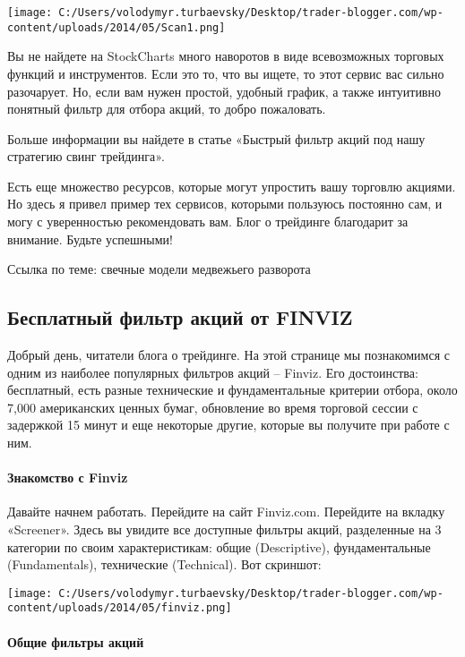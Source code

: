 \documentclass[a5paper]{article}
\begin{document}
\texttt{[image: C:/Users/volodymyr.turbaevsky/Desktop/trader-blogger.com/wp-content/uploads/2014/05/Scan1.png]}

Вы не найдете на StockCharts много наворотов в виде всевозможных торговых функций и инструментов. Если это то, что вы ищете, то этот сервис вас сильно разочарует. Но, если вам нужен простой, удобный график, а также интуитивно понятный фильтр для отбора акций, то добро пожаловать.

Больше информации вы найдете в статье «Быстрый фильтр акций под нашу стратегию свинг трейдинга».

Есть еще множество ресурсов, которые могут упростить вашу торговлю акциями. Но здесь я привел пример тех сервисов, которыми пользуюсь постоянно сам, и могу с уверенностью рекомендовать вам. Блог о трейдинге благодарит за внимание. Будьте успешными!


Ссылка по теме: свечные модели медвежьего разворота

\subsection{Бесплатный фильтр акций от FINVIZ}

Добрый день, читатели блога о трейдинге. На этой странице мы
познакомимся с одним из наиболее популярных фильтров акций –
Finviz. Его достоинства: бесплатный, есть разные технические и
фундаментальные критерии отбора, около 7,000 американских ценных
бумаг, обновление во время торговой сессии с задержкой 15 минут и еще
некоторые другие, которые вы получите при работе с ним.

\paragraph{Знакомство с Finviz}

Давайте начнем работать. Перейдите на сайт Finviz.com. Перейдите на
вкладку «Screener». Здесь вы увидите все доступные фильтры акций,
разделенные на 3 категории по своим характеристикам: общие
(Descriptive), фундаментальные (Fundamentals), технические
(Technical). Вот скриншот:

\texttt{[image: C:/Users/volodymyr.turbaevsky/Desktop/trader-blogger.com/wp-content/uploads/2014/05/finviz.png]}

\paragraph{Общие фильтры акций}
\end{document}
